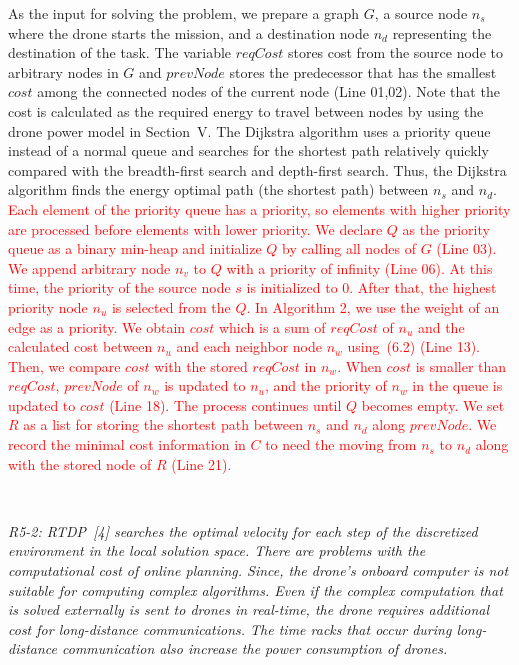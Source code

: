 \documentclass[onecolumn]{IEEEconf}
\begin{document}
\begin{description}
\begin{mdframed}[ linewidth=.75pt, userdefinedwidth=0.9\textwidth]
{    As the input for solving the problem, we prepare a graph $G$, a source node $n_s$ where the drone starts the mission, and a destination node $n_d$ representing the destination of the task.
    The variable $reqCost$ stores cost from the source node to arbitrary nodes in $G$ and $prevNode$ stores the predecessor that has the smallest $cost$ among the connected nodes of the current node (Line 01,02). 
    Note that the cost is calculated as the required energy to travel between nodes by using the drone power model in Section~V.
    The Dijkstra algorithm uses a priority queue instead of a normal queue and searches for the shortest path relatively quickly compared with the breadth-first search and depth-first search.
    Thus, the Dijkstra algorithm finds the energy optimal path (the shortest path) between $n_s$ and $n_d$.}~\\
    \textcolor{red}{Each element of the priority queue has a priority, so elements with higher priority are processed before elements with lower priority.
    We declare $Q$ as the priority queue as a binary min-heap and initialize $Q$ by calling all nodes of $G$ (Line 03).
    We append arbitrary node $n_v$ to $Q$ with a priority of infinity (Line 06). 
    At this time, the priority of the source node $s$ is initialized to 0.
    After that, the highest priority node $n_u$ is selected from the $Q$. 
    In Algorithm 2, we use the weight of an edge as a priority.
    We obtain $cost$ which is a sum of $reqCost$ of $n_u$ and the calculated cost between $n_u$ and each neighbor node $n_w$ using~(6.2) (Line 13). 
    Then, we compare $cost$ with the stored $reqCost$ in $n_w$.
    When $cost$ is smaller than $reqCost$, $prevNode$ of $n_w$ is updated to $n_u$, and the priority of $n_w$ in the queue is updated to $cost$ (Line 18).
    The process continues until $Q$ becomes empty.
    We set $R$ as a list for storing the shortest path between $n_s$ and $n_d$ along $prevNode$.
    We record the minimal cost information in $C$ to need the moving from $n_s$ to $n_d$ along with the stored node of $R$ (Line 21).
    }
    \end{mdframed} 
    ~\\
	\item \textit
	{
	R5-2: RTDP~[4] searches the optimal velocity for each step of the discretized environment in the local solution space. %
	There are problems with the computational cost of online planning. Since, the drone’s onboard computer is not suitable for computing complex algorithms. Even if the complex computation that is solved externally is sent to drones in real-time, the drone requires additional cost for long-distance communications. The time racks that occur during long-distance communication also increase the power consumption of drones.
}
\end{description}
\end{document}
